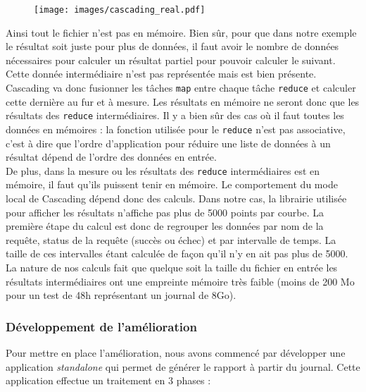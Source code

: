 \begin{figure}[H]
	\centering
	\texttt{[image: images/cascading\_real.pdf]}
\end{figure}

Ainsi tout le fichier n'est pas en mémoire. Bien sûr, pour que dans notre exemple le résultat soit juste pour plus de données, il faut avoir le nombre de données nécessaires pour calculer un résultat partiel pour pouvoir calculer le suivant. Cette donnée intermédiaire n'est pas représentée mais est bien présente.\\

Cascading va donc fusionner les tâches \verb+map+ entre chaque tâche \verb+reduce+ et calculer cette dernière au fur et à mesure. Les résultats en mémoire ne seront donc que les résultats des \verb+reduce+ intermédiaires. Il y a bien sûr des cas où il faut toutes les données en mémoires : la fonction utilisée pour le \verb+reduce+ n'est pas associative, c'est à dire que l'ordre d'application pour réduire une liste de données à un résultat dépend de l'ordre des données en entrée.\\

De plus, dans la mesure ou les résultats des \verb+reduce+ intermédiaires est en mémoire, il faut qu'ils puissent tenir en mémoire. Le comportement du mode local de Cascading dépend donc des calculs. Dans notre cas, la librairie utilisée pour afficher les résultats n'affiche pas plus de 5000 points par courbe. La première étape du calcul est donc de regrouper les données par nom de la requête, status de la requête (succès ou échec) et par intervalle de temps. La taille de ces intervalles étant calculée de façon qu'il n'y en ait pas plus de 5000. La nature de nos calculs fait que quelque soit la taille du fichier en entrée les résultats intermédiaires ont une empreinte mémoire très faible (moins de 200 Mo pour un test de 48h représentant un journal de 8Go).\\

\subsubsection{Développement de l'amélioration}

Pour mettre en place l'amélioration, nous avons commencé par développer une application \textit{standalone} qui permet de générer le rapport à partir du journal. Cette application effectue un traitement en 3 phases :

